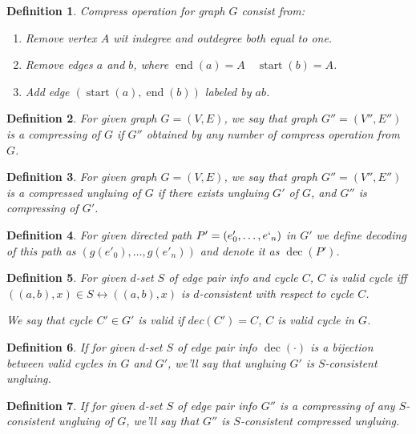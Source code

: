 \documentclass[12pt,a4paper,oneside]{article}
\newtheorem{definition}{Definition}
\begin{document}
\begin{definition}
\emph{Compress operation} for graph $G$ consist from:
\begin{enumerate}
\item Remove vertex $A$ wit indegree and outdegree both equal to one.
\item Remove edges $a$ and $b$, where $\mathop{end}(a) = A\quad \mathop{start}(b) = A$.
\item Add edge $(\mathop{start}(a),\mathop{end}(b))$ labeled by $ab$.
\end{enumerate} 
\end{definition}
\begin{definition}
For given graph $G=(V, E)$, we say that graph $G'' = (V'', E'')$ is a \emph{compressing} of $G$ if $G''$ obtained by any number of compress operation from $G$.
\end{definition}
\begin{definition}
For given graph $G=(V, E)$, we say that graph $G'' = (V'', E'')$ is a \emph{compressed ungluing} of $G$ if there exists ungluing $G'$ of $G$, and $G''$ is compressing of $G'$.
\end{definition}


\begin{definition}
For given directed path $P' = (e'_0, \ldots, e`_n)$ in $G' $ we define \emph{decoding} of this path as $(g(e'_0), \ldots, g(e'_n))$ and denote it as $\mathop{dec}(P')$.
\end{definition}

\begin{definition}

For given $d$-set $S$ of edge pair info and cycle $C$, $C$ is \emph{valid} cycle iff $((a, b), x) \in S \leftrightarrow  ((a, b), x)$ is $d$-consistent with respect to cycle $C$.

We say that cycle $C' \in G'$ is \emph{valid} if $dec(C')=C$, $C$ is valid cycle in $G$.
\end{definition}
\begin{definition}  
If for given $d$-set $S$ of edge pair info $\mathop{dec}(\cdot)$ is a bijection between valid cycles in $G$ and $G'$, we'll say that ungluing $G'$ is \emph{$S$-consistent ungluing}.
\end{definition}

\begin{definition}  
If for given $d$-set $S$ of edge pair info $G''$ is a compressing of any $S$-consistent ungluing of $G$, we'll say that $G''$ is \emph{$S$-consistent compressed ungluing}.
\end{definition}
\end{document}
